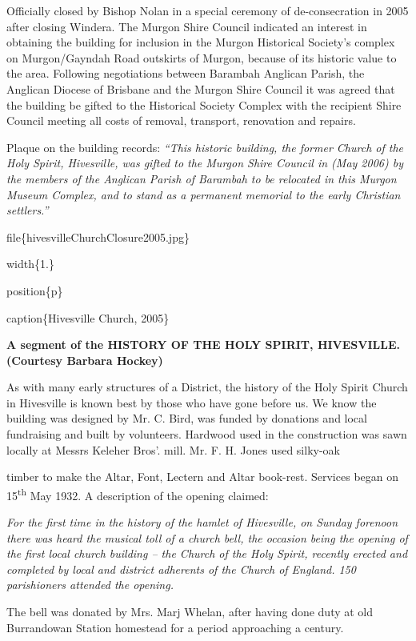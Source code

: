 Officially closed by Bishop Nolan in a special ceremony of de-consecration in 2005 after closing Windera. The Murgon Shire Council indicated an interest in obtaining the building for inclusion in the Murgon Historical Society's complex on Murgon/Gayndah Road outskirts of Murgon, because of its historic value to the area. Following negotiations between Barambah Anglican Parish, the Anglican Diocese of Brisbane and the Murgon Shire Council it was agreed that the building be gifted to the Historical Society Complex with the recipient Shire Council meeting all costs of removal, transport, renovation and repairs.

Plaque on the building records: \emph{``This historic building, the former Church of the Holy Spirit, Hivesville, was gifted to the Murgon Shire Council in (May 2006) by the members of the Anglican Parish of Barambah to be relocated in this Murgon Museum Complex, and to stand as a permanent memorial to the early Christian settlers.''}

file\{hivesvilleChurchClosure2005.jpg\}

width\{1.\}

position\{p\}

caption\{Hivesville Church, 2005\}

\textbf{A segment of the HISTORY OF THE HOLY SPIRIT, HIVESVILLE. (Courtesy Barbara Hockey)}

As with many early structures of a District, the history of the Holy Spirit Church in Hivesville is known best by those who have gone before us. We know the building was designed by Mr. C. Bird, was funded by donations and local fundraising and built by volunteers. Hardwood used in the construction was sawn locally at Messrs Keleher Bros'. mill. Mr. F. H. Jones used silky-oak

timber to make the Altar, Font, Lectern and Altar book-rest. Services began on 15\textsuperscript{th} May 1932. A description of the opening claimed:

\emph{For the first time in the history of the hamlet of Hivesville, on Sunday forenoon there was heard the musical toll of a church bell, the occasion being the opening of the first local church building -- the Church of the Holy Spirit, recently erected and completed by local and district adherents of the Church of England. 150 parishioners attended the opening.}

The bell was donated by Mrs. Marj Whelan, after having done duty at old Burrandowan Station homestead for a period approaching a century.

